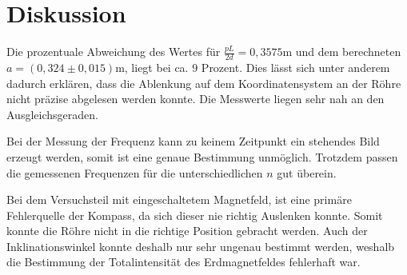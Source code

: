 \section{Diskussion}
\label{sec:Diskussion}

Die prozentuale Abweichung des Wertes für $\frac{pL}{2d} = 0,3575 \si{\meter} $ und dem berechneten $a = (0,324 \pm 0,015)  \si{\meter}$, liegt bei ca. $9$ Prozent.
Dies lässt sich unter anderem dadurch erklären, dass die Ablenkung auf dem Koordinatensystem an der Röhre nicht präzise abgelesen werden konnte.
Die Messwerte liegen sehr nah an den Ausgleichsgeraden.

\noindent Bei der Messung der Frequenz kann zu keinem Zeitpunkt ein stehendes Bild erzeugt werden, somit ist eine genaue Bestimmung unmöglich. 
Trotzdem passen die gemessenen Frequenzen für die unterschiedlichen $n$ gut überein.

\noindent Bei dem Versuchsteil mit eingeschaltetem Magnetfeld, ist eine primäre Fehlerquelle der Kompass, da sich dieser nie richtig Auslenken konnte.
Somit konnte die Röhre nicht in die richtige Position gebracht werden. 
Auch der Inklinationswinkel konnte deshalb nur sehr ungenau bestimmt werden, weshalb die Bestimmung der Totalintensität des Erdmagnetfeldes fehlerhaft war.